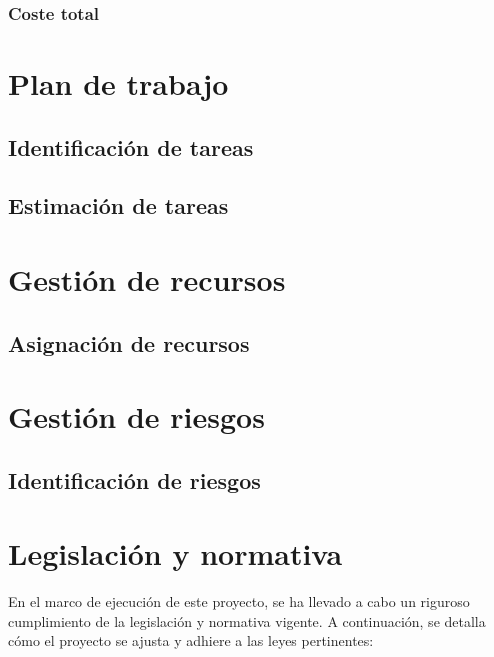 \documentclass[12pt,a4paper,onecolumn,oneside]{report}
\begin{document}
\subsubsection{Coste total}

\section{Plan de trabajo}
\label{Plan de trabajo}


\subsection{Identificación de tareas}
\label{Identificación de tareas}



\subsection{Estimación de tareas}
\label{Estimación de tareas}



\section{Gestión de recursos}
\label{Gestión de recursos}

\subsection{Asignación de recursos}
\label{asignacion de recursos}




\section{Gestión de riesgos}

\subsection{Identificación de riesgos}

\clearpage
\section{Legislación y normativa}

En el marco de ejecución de este proyecto, se ha llevado a cabo un riguroso cumplimiento de la legislación y normativa vigente. A continuación, se detalla cómo el proyecto se ajusta y adhiere a las leyes pertinentes:
\end{document}
